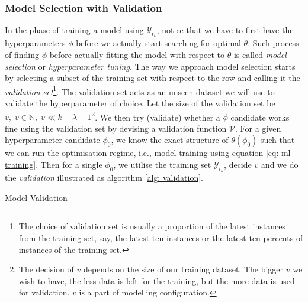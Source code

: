 \subsubsection{Model Selection with Validation}
In the phase of training a model using $\mathcal{Y}_{t_k}$, notice that we have to first have the hyperparameters $\phi$ before we actually start searching for optimal $\theta$. Such process of finding $\phi$ before actually fitting the model with respect to $\theta$ is called \textit{model selection} or \textit{hyperparameter tuning}. The way we approach model selection starts by selecting a subset of the training set with respect to the row and calling it the \textit{validation set}\footnote{The choice of validation set is usually a proportion of the latest instances from the training set, say, the latest ten instances or the latest ten percents of instances of the training set.}. The validation set acts as an unseen dataset we will use to validate the hyperparameter of choice. Let the size of the validation set be $v, \; v \in \mathbb{N}, \; v \ll k - \lambda + 1$\footnote{The decision of $v$ depends on the size of our training dataset. The bigger $v$ we wish to have, the less data is left for the training, but the more data is used for validation. $v$ is a part of modelling configuration.}. We then try (validate) whether a $\phi$ candidate works fine using the validation set by devising a validation function $\mathcal{V}$. For a given hyperparameter candidate $\phi_0$, we know the exact structure of $\theta(\phi_0)$ such that we can run the optimisation regime, i.e., model training using equation \ref{eq: ml training}. Then for a single $\phi_0$, we utilise the training set $\mathcal{Y}_{t_k}$, decide $v$ and we do the \textit{validation} illustrated as algorithm \ref{alg: validation}.
\begin{algorithm}
    \caption{Model Validation}\label{alg: validation}
    \begin{algorithmic}
    \EndFor
    \end{algorithmic}
\end{algorithm}
